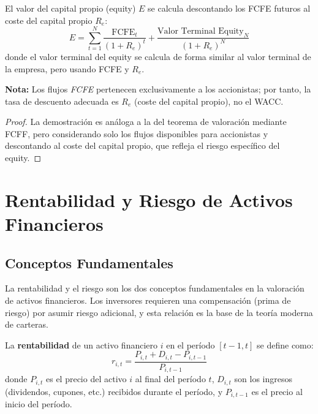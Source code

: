 \begin{teorema}
El valor del capital propio (equity) $E$ se calcula descontando los FCFE futuros al coste del capital propio $R_e$:
\begin{equation}
E = \sum_{t=1}^{N} \frac{\text{FCFE}_t}{(1 + R_e)^t} + \frac{\text{Valor Terminal Equity}_N}{(1 + R_e)^N}
\end{equation}
donde el valor terminal del equity se calcula de forma similar al valor terminal de la empresa, pero usando FCFE y $R_e$.
\end{teorema}

\textbf{Nota:} Los flujos \textit{FCFE} pertenecen exclusivamente a los accionistas; por tanto, la tasa de descuento adecuada es $R_e$ (coste del capital propio), no el WACC.

\begin{proof}
La demostración es análoga a la del teorema de valoración mediante FCFF, pero considerando solo los flujos disponibles para accionistas y descontando al coste del capital propio, que refleja el riesgo específico del equity.
\end{proof}

\section{Rentabilidad y Riesgo de Activos Financieros}

\subsection{Conceptos Fundamentales}

La rentabilidad y el riesgo son los dos conceptos fundamentales en la valoración de activos financieros. Los inversores requieren una compensación (prima de riesgo) por asumir riesgo adicional, y esta relación es la base de la teoría moderna de carteras.

\begin{definicion}
La \textbf{rentabilidad} de un activo financiero $i$ en el período $[t-1, t]$ se define como:
\begin{equation}
r_{i,t} = \frac{P_{i,t} + D_{i,t} - P_{i,t-1}}{P_{i,t-1}}
\end{equation}
donde $P_{i,t}$ es el precio del activo $i$ al final del período $t$, $D_{i,t}$ son los ingresos (dividendos, cupones, etc.) recibidos durante el período, y $P_{i,t-1}$ es el precio al inicio del período.
\end{definicion}

